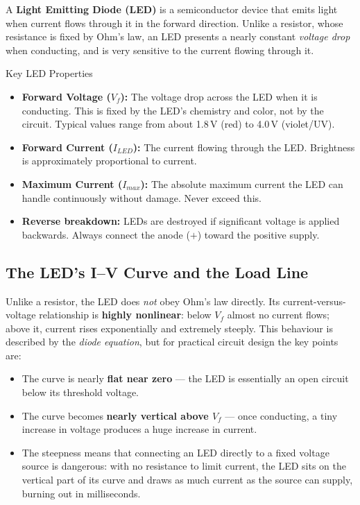 \documentclass[11pt,letterpaper]{article}
\newcommand{\volt}{\,\si{V}}
\newcommand{\Vf}{V_f}
\newcommand{\Imax}{I_{max}}
\newcommand{\Iled}{I_{LED}}
\begin{document}
A \textbf{Light Emitting Diode (LED)} is a semiconductor device that emits light when
current flows through it in the forward direction. Unlike a resistor, whose resistance
is fixed by Ohm's law, an LED presents a nearly constant \emph{voltage drop} when
conducting, and is very sensitive to the current flowing through it.

\begin{conceptbox}{Key LED Properties}
\begin{itemize}[leftmargin=1.5em]
  \item \textbf{Forward Voltage ($\Vf$):} The voltage drop across the LED when it
    is conducting. This is fixed by the LED's chemistry and color, not by the circuit.
    Typical values range from about 1.8\volt{} (red) to 4.0\volt{} (violet/UV).
  \item \textbf{Forward Current ($\Iled$):} The current flowing through the LED.
    Brightness is approximately proportional to current.
  \item \textbf{Maximum Current ($\Imax$):} The absolute maximum current the LED can
    handle continuously without damage. Never exceed this.
  \item \textbf{Reverse breakdown:} LEDs are destroyed if significant voltage is
    applied backwards. Always connect the anode ($+$) toward the positive supply.
\end{itemize}
\end{conceptbox}


\subsection{The LED's I--V Curve and the Load Line}

Unlike a resistor, the LED does \emph{not} obey Ohm's law directly. Its
current-versus-voltage relationship is \textbf{highly nonlinear}: below $\Vf$ almost
no current flows; above it, current rises exponentially and extremely steeply.
This behaviour is described by the \emph{diode equation}, but for practical circuit
design the key points are:

\begin{itemize}[leftmargin=2em]
	\item The curve is nearly \textbf{flat near zero} --- the LED is essentially an
	open circuit below its threshold voltage.
	\item The curve becomes \textbf{nearly vertical above $\Vf$} --- once conducting,
	a tiny increase in voltage produces a huge increase in current.
	\item The steepness means that connecting an LED directly to a fixed voltage source
	is dangerous: with no resistance to limit current, the LED sits on the vertical
	part of its curve and draws as much current as the source can supply, burning out
	in milliseconds.
\end{itemize}
\end{document}
